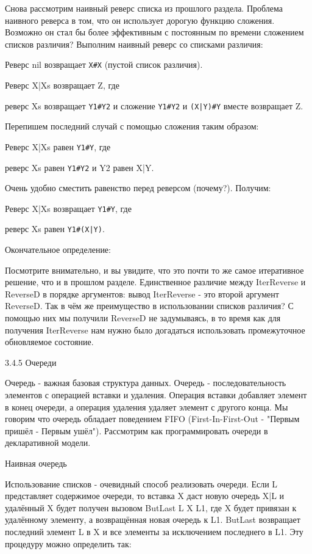 Снова рассмотрим наивный реверс списка из прошлого раздела. Проблема наивного реверса в том, что он использует дорогую функцию сложения. Возможно он стал бы более эффективным с постоянным по времени сложением списков различия? Выполним наивный реверс со списками различия:

Реверс nil возвращает \verb|X#X| (пустой список различия).

Реверс X|Xs возвращает Z, где

реверс Xs возвращает \verb|Y1#Y2| и
сложение \verb|Y1#Y2| и \verb!(X|Y)#Y! вместе возвращает Z.

Перепишем последний случай с помощью сложения таким образом:

Реверс X|Xs равен \verb|Y1#Y|, где

реверс Xs равен \verb|Y1#Y2| и
Y2 равен X|Y.

Очень удобно сместить равенство перед реверсом (почему?). Получим:

Реверс X|Xs возвращает \verb|Y1#Y|, где

реверс Xs равен \verb!Y1#(X|Y)!.

Окончательное определение:

Посмотрите внимательно, и вы увидите, что это почти то же самое итеративное решение, что и в прошлом разделе. Единственное различие между IterReverse и ReverseD в порядке аргументов: вывод IterReverse - это второй аргумент ReverseD. Так в чём же преимущество в использовании списков различия? С помощью них мы получили ReverseD не задумываясь, в то время как для получения IterReverse нам нужно было догадаться использовать промежуточное обновляемое состояние.

3.4.5 Очереди

Очередь - важная базовая структура данных. Очередь - последовательность элементов с операцией вставки и удаления. Операция вставки добавляет элемент в конец очереди, а операция удаления удаляет элемент с другого конца. Мы говорим что очередь обладает поведением FIFO (First-In-First-Out - "Первым пришёл - Первым ушёл"). Рассмотрим как программировать очереди в декларативной модели.

Наивная очередь

Использование списков - очевидный способ реализовать очереди. Если L представляет содержимое очереди, то вставка X даст новую очередь X|L и удалённый X будет получен вызовом {ButLast L X L1}, где X будет привязан к удалённому элементу, а возвращённая новая очередь к L1. ButLast возвращает последний элемент L в X и все элементы за исключением последнего в L1. Эту процедуру можно определить так:

